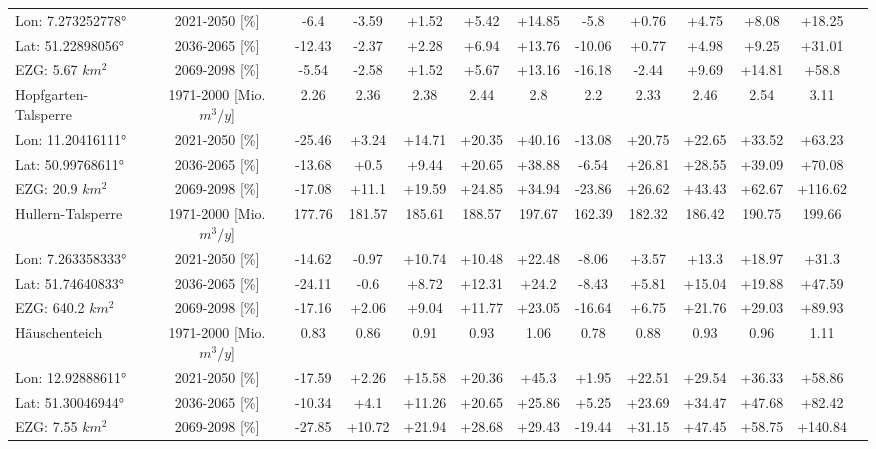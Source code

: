 \begin{longtable}{@{\extracolsep{\fill}}lc|ccccc||cccccc}
\cline{2-13} 
Lon: 7.273252778° & 2021-2050 [\%]  & -6.4 & -3.59 & +1.52 & +5.42 & +14.85 & -5.8 & +0.76 & +4.75 & +8.08 & +18.25 & \\ 
Lat: 51.22898056° & 2036-2065 [\%]  & -12.43 & -2.37 & +2.28 & +6.94 & +13.76 & -10.06 & +0.77 & +4.98 & +9.25 & +31.01 & \\ 
EZG: 5.67 $km^2$ & 2069-2098 [\%]  & -5.54 & -2.58 & +1.52 & +5.67 & +13.16 & -16.18 & -2.44 & +9.69 & +14.81 & +58.8 & \\ 
\hline 
Hopfgarten-Talsperre & 1971-2000 [Mio. $m^3/y$]  & 2.26 & 2.36 & 2.38 & 2.44 & 2.8 & 2.2 & 2.33 & 2.46 & 2.54 & 3.11 & \\ 
\cline{2-13} 
Lon: 11.20416111° & 2021-2050 [\%]  & -25.46 & +3.24 & +14.71 & +20.35 & +40.16 & -13.08 & +20.75 & +22.65 & +33.52 & +63.23 & \\ 
Lat: 50.99768611° & 2036-2065 [\%]  & -13.68 & +0.5 & +9.44 & +20.65 & +38.88 & -6.54 & +26.81 & +28.55 & +39.09 & +70.08 & \\ 
EZG: 20.9 $km^2$ & 2069-2098 [\%]  & -17.08 & +11.1 & +19.59 & +24.85 & +34.94 & -23.86 & +26.62 & +43.43 & +62.67 & +116.62 & \\ 
\hline 
Hullern-Talsperre & 1971-2000 [Mio. $m^3/y$]  & 177.76 & 181.57 & 185.61 & 188.57 & 197.67 & 162.39 & 182.32 & 186.42 & 190.75 & 199.66 & \\ 
\cline{2-13} 
Lon: 7.263358333° & 2021-2050 [\%]  & -14.62 & -0.97 & +10.74 & +10.48 & +22.48 & -8.06 & +3.57 & +13.3 & +18.97 & +31.3 & \\ 
Lat: 51.74640833° & 2036-2065 [\%]  & -24.11 & -0.6 & +8.72 & +12.31 & +24.2 & -8.43 & +5.81 & +15.04 & +19.88 & +47.59 & \\ 
EZG: 640.2 $km^2$ & 2069-2098 [\%]  & -17.16 & +2.06 & +9.04 & +11.77 & +23.05 & -16.64 & +6.75 & +21.76 & +29.03 & +89.93 & \\ 
\hline 
Häuschenteich & 1971-2000 [Mio. $m^3/y$]  & 0.83 & 0.86 & 0.91 & 0.93 & 1.06 & 0.78 & 0.88 & 0.93 & 0.96 & 1.11 & \\ 
\cline{2-13} 
Lon: 12.92888611° & 2021-2050 [\%]  & -17.59 & +2.26 & +15.58 & +20.36 & +45.3 & +1.95 & +22.51 & +29.54 & +36.33 & +58.86 & \\ 
Lat: 51.30046944° & 2036-2065 [\%]  & -10.34 & +4.1 & +11.26 & +20.65 & +25.86 & +5.25 & +23.69 & +34.47 & +47.68 & +82.42 & \\ 
EZG: 7.55 $km^2$ & 2069-2098 [\%]  & -27.85 & +10.72 & +21.94 & +28.68 & +29.43 & -19.44 & +31.15 & +47.45 & +58.75 & +140.84 & \\ 
\hline 

\end{longtable}
